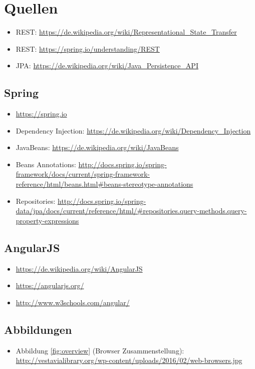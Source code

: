 \section{Quellen}

\begin{itemize}
	\item REST: \url{https://de.wikipedia.org/wiki/Representational_State_Transfer} 
	\item REST: \url{https://spring.io/understanding/REST} 
	\item JPA: \url{https://de.wikipedia.org/wiki/Java_Persistence_API} 
\end{itemize}

\subsection{Spring}

\begin{itemize}
	\item \url{https://spring.io}
	\item Dependency Injection: \url{https://de.wikipedia.org/wiki/Dependency_Injection}
	\item JavaBeans: \url{https://de.wikipedia.org/wiki/JavaBeans}
	\item Beans Annotations: \url{http://docs.spring.io/spring-framework/docs/current/spring-framework-reference/html/beans.html#beans-stereotype-annotations}
	\item Repositories: \url{http://docs.spring.io/spring-data/jpa/docs/current/reference/html/#repositories.query-methods.query-property-expressions}
\end{itemize}

\subsection{AngularJS}

\begin{itemize}
	\item \url{https://de.wikipedia.org/wiki/AngularJS} 
	\item \url{https://angularjs.org/}
	\item \url{http://www.w3schools.com/angular/}
\end{itemize}

\subsection{Abbildungen}

\begin{itemize}
	\item Abbildung \ref{fig:overview} (Browser Zusammenstellung): \url{http://vestavialibrary.org/wp-content/uploads/2016/02/web-browsers.jpg}

\end{itemize}